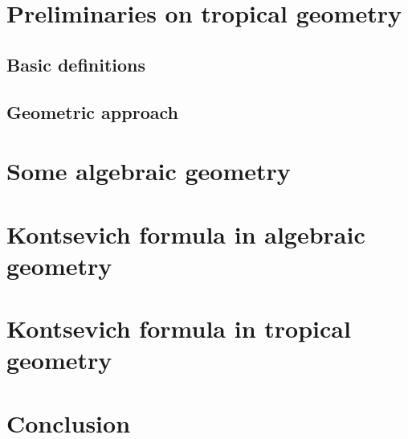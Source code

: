 \documentclass{amsbook}
\begin{document}
\tableofcontents

\chapter{Preliminaries on tropical geometry}
\label{chap:sturmfels}

\section{Basic definitions}
\label{sec:basictropical}

\section{Geometric approach}
\label{sec:gubler}



\chapter{Some algebraic geometry}
\label{chap:alggeom}

\chapter{Kontsevich formula in algebraic geometry}
\label{chap:kontalggeom}

\chapter{Kontsevich formula in tropical geometry}
\label{chap:kottropgeom}

\chapter{Conclusion}
\label{chap:conclusion}




\end{document}

